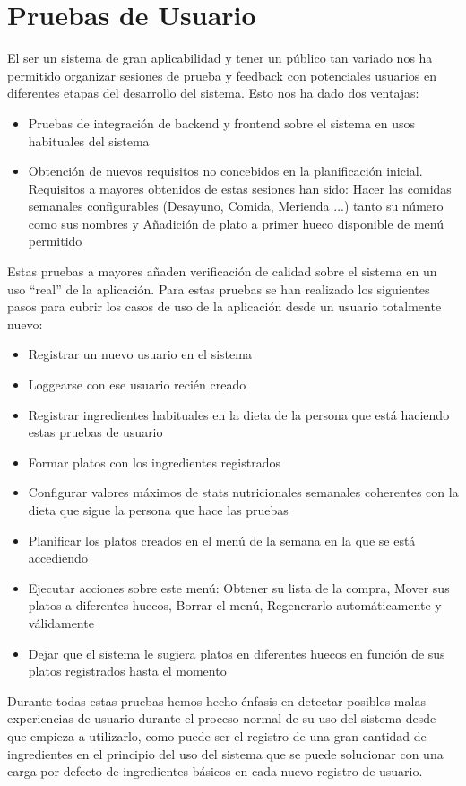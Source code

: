 \documentclass[12pt, a4paper, twoside]{book}
\begin{document}
	\section{Pruebas de Usuario}
	El ser un sistema de gran aplicabilidad y tener un público tan variado nos ha permitido organizar sesiones de prueba y feedback con potenciales usuarios en diferentes etapas del desarrollo del sistema.
	Esto nos ha dado dos ventajas:
	\begin{itemize}
		\item Pruebas de integración de backend y frontend sobre el sistema en usos habituales del sistema
		\item Obtención de nuevos requisitos no concebidos en la planificación inicial. Requisitos a mayores obtenidos de estas sesiones han sido: Hacer las comidas semanales configurables (Desayuno, Comida, Merienda ...) tanto su número como sus nombres y Añadición de plato a primer hueco disponible de menú permitido
	\end{itemize}
	Estas pruebas a mayores añaden verificación de calidad sobre el sistema en un uso ``real'' de la aplicación. 
	Para estas pruebas se han realizado los siguientes pasos para cubrir los casos de uso de la aplicación desde un usuario totalmente nuevo:
	\begin{itemize}
		\item Registrar un nuevo usuario en el sistema
		\item Loggearse con ese usuario recién creado
		\item Registrar ingredientes habituales en la dieta de la persona que está haciendo estas pruebas de usuario
		\item Formar platos con los ingredientes registrados
		\item Configurar valores máximos de stats nutricionales semanales coherentes con la dieta que sigue la persona que hace las pruebas
		\item Planificar los platos creados en el menú de la semana en la que se está accediendo
		\item Ejecutar acciones sobre este menú: Obtener su lista de la compra, Mover sus platos a diferentes huecos, Borrar el menú, Regenerarlo automáticamente y válidamente
		\item Dejar que el sistema le sugiera platos en diferentes huecos en función de sus platos registrados hasta el momento
	\end{itemize}
	Durante todas estas pruebas hemos hecho énfasis en detectar posibles malas experiencias de usuario durante el proceso normal de su uso del sistema desde que empieza a utilizarlo, como puede ser el registro de una gran cantidad de ingredientes en el principio del uso del sistema que se puede solucionar con una carga por defecto de ingredientes básicos en cada nuevo registro de usuario.
\end{document}
